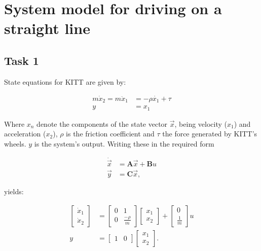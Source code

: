 \documentclass[11pt,titlepage]{report}
\begin{document}
\chapter{System model for driving on a straight line}
\section{Task 1}
State equations for KITT are given by:

\begin{align} \label{eq:task1-state-eq}
    m\dot{x}_2 = m\ddot{x}_1 &= -\rho \dot{x_{1}} + \tau \\
    y &= x_1
\end{align}

Where $x_n$ denote the components of the state vector $\vec{x}$, being velocity ($x_1$) and acceleration ($x_2$), $\rho$ is the friction coefficient and $\tau$ the  force generated by KITT's wheels. $y$ is the system's output. Writing these in the required form

\begin{align*}
    \dot{\vec{x}} &= \mathbf{A}\vec{x} + \mathbf{B}u \\
    \vec{y} &= \mathbf{C}\vec{x},
\end{align*}

yields:

\begin{align}\label{eq:task1-system}
    \begin{bmatrix}
        \dot{x}_1 \\ 
        \dot{x}_2
    \end{bmatrix} &= 
    \begin{bmatrix}
        0 & 1 \\
        0 & \frac{-\rho}{m}
    \end{bmatrix}
    \begin{bmatrix}
        x_1 \\ 
        x_2
    \end{bmatrix} +
    \begin{bmatrix}
        0 \\ 
        \frac{1}{m}
    \end{bmatrix}
    u
    \\
    y &= 
    \begin{bmatrix}
        1 & 0
    \end{bmatrix}
    \begin{bmatrix}
        x_1 \\ 
        x_2
    \end{bmatrix}.
\end{align}
\end{document}
